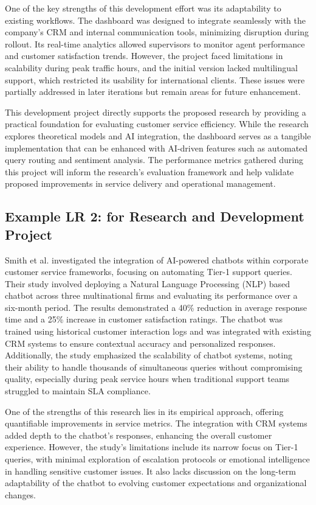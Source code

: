 One of the key strengths of this development effort was its adaptability to existing workflows. The dashboard was designed to integrate seamlessly with the company’s CRM and internal communication tools, minimizing disruption during rollout. Its real-time analytics allowed supervisors to monitor agent performance and customer satisfaction trends. However, the project faced limitations in scalability during peak traffic hours, and the initial version lacked multilingual support, which restricted its usability for international clients. These issues were partially addressed in later iterations but remain areas for future enhancement.

This development project directly supports the proposed research by providing a practical foundation for evaluating customer service efficiency. While the research explores theoretical models and AI integration, the dashboard serves as a tangible implementation that can be enhanced with AI-driven features such as automated query routing and sentiment analysis. The performance metrics gathered during this project will inform the research’s evaluation framework and help validate proposed improvements in service delivery and operational management.

 \subsection{Example LR 2: for Research and Development Project}
Smith et al. \cite{ref:Bishop:2006} investigated the integration of AI-powered chatbots within corporate customer service frameworks, focusing on automating Tier-1 support queries. Their study involved deploying a Natural Language Processing (NLP) based chatbot across three multinational firms and evaluating its performance over a six-month period. The results demonstrated a 40\% reduction in average response time and a 25\% increase in customer satisfaction ratings. The chatbot was trained using historical customer interaction logs and was integrated with existing CRM systems to ensure contextual accuracy and personalized responses. Additionally, the study emphasized the scalability of chatbot systems, noting their ability to handle thousands of simultaneous queries without compromising quality, especially during peak service hours when traditional support teams struggled to maintain SLA compliance.

One of the strengths of this research lies in its empirical approach, offering quantifiable improvements in service metrics. The integration with CRM systems added depth to the chatbot’s responses, enhancing the overall customer experience. However, the study’s limitations include its narrow focus on Tier-1 queries, with minimal exploration of escalation protocols or emotional intelligence in handling sensitive customer issues. It also lacks discussion on the long-term adaptability of the chatbot to evolving customer expectations and organizational changes.

